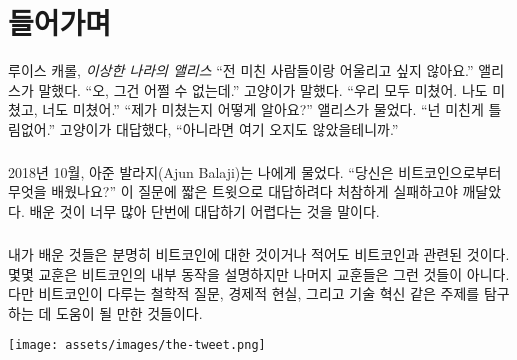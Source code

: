 \chapter*{들어가며}
\label{ch:introduction}

\begin{chapquote}{루이스 캐롤, \textit{이상한 나라의 앨리스}}
	\enquote{전 미친 사람들이랑 어울리고 싶지 않아요.} 앨리스가 말했다. 
	\enquote{오, 그건 어쩔 수 없는데.}  고양이가 말했다. 
	\enquote{우리 모두 미쳤어. 나도 미쳤고, 너도 미쳤어.} 
	\enquote{제가 미쳤는지 어떻게 알아요?} 앨리스가 물었다. 
	\enquote{넌 미친게 틀림없어.} 고양이가 대답했다, 
	\enquote{아니라면 여기 오지도 않았을테니까.}
\end{chapquote}


\paragraph{}
2018년 10월, 아준 발라지(Ajun Balaji)는 나에게 물었다.
\enquote{당신은 비트코인으로부터 무엇을 배웠나요?} 이 질문에 짧은 트윗으로 대답하려다 처참하게 실패하고야 깨달았다.
배운 것이 너무 많아 단번에 대답하기 어렵다는 것을 말이다.

\paragraph{}
내가 배운 것들은 분명히 비트코인에 대한 것이거나 적어도 비트코인과 관련된 것이다. 
몇몇 교훈은 비트코인의 내부 동작을 설명하지만 나머지 교훈들은 그런 것들이 아니다.
다만 비트코인이 다루는 철학적 질문, 경제적 현실, 그리고 기술 혁신 같은 주제를 탐구하는 데 도움이 될 만한 것들이다. 

\begin{center}
	\texttt{[image: assets/images/the-tweet.png]}
\end{center}

